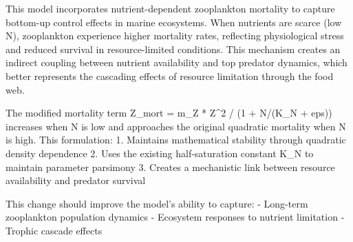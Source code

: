 This model incorporates nutrient-dependent zooplankton mortality to capture bottom-up control effects in marine ecosystems. When nutrients are scarce (low N), zooplankton experience higher mortality rates, reflecting physiological stress and reduced survival in resource-limited conditions. This mechanism creates an indirect coupling between nutrient availability and top predator dynamics, which better represents the cascading effects of resource limitation through the food web.

The modified mortality term Z_mort = m_Z * Z^2 / (1 + N/(K_N + eps)) increases when N is low and approaches the original quadratic mortality when N is high. This formulation:
1. Maintains mathematical stability through quadratic density dependence
2. Uses the existing half-saturation constant K_N to maintain parameter parsimony
3. Creates a mechanistic link between resource availability and predator survival

This change should improve the model's ability to capture:
- Long-term zooplankton population dynamics
- Ecosystem responses to nutrient limitation
- Trophic cascade effects

